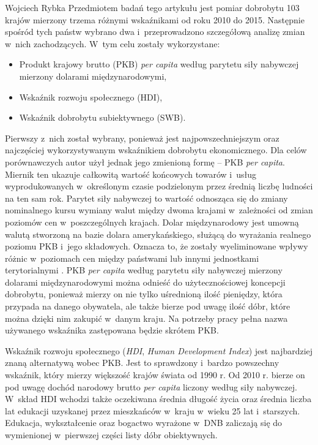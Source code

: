 \begin{artplenv}{Wojciech Rybka}
Przedmiotem badań tego artykułu jest pomiar dobrobytu 103 krajów mierzony trzema różnymi wskaźnikami od roku 2010 do
2015. Następnie spośród tych państw wybrano dwa i~przeprowadzono szczegółową analizę zmian w~nich zachodzących.
W~tym celu zostały wykorzystane: 

\begin{itemize}
\item Produkt krajowy brutto (PKB) \textit{per capita} według parytetu siły nabywczej mierzony dolarami międzynarodowymi,
\item Wskaźnik rozwoju społecznego (HDI),
\item Wskaźnik dobrobytu subiektywnego (SWB).
\end{itemize}

Pierwszy z~nich został wybrany, ponieważ jest najpowszechniejszym oraz najczęściej wykorzystywanym wskaźnikiem dobrobytu
ekonomicznego.
Dla celów porównawczych autor użył jednak jego zmienioną formę -- PKB \textit{per capita}. Miernik ten ukazuje
całkowitą wartość
końcowych towarów i~usług wyprodukowanych w~określonym czasie podzielonym przez średnią liczbę ludności na ten sam rok.
Parytet siły nabywczej to wartość odnosząca się do zmiany nominalnego kursu wymiany walut między dwoma krajami
w~zależności od zmian
poziomów cen w~poszczególnych krajach. Dolar międzynarodowy jest umowną walutą stworzoną na bazie dolara
amerykańskiego, służącą do wyrażania realnego poziomu PKB i~jego składowych. Oznacza to, że zostały wyeliminowane
wpływy różnic w~poziomach cen między państwami lub innymi jednostkami terytorialnymi
\parencite{international_monetary_fund_world_2019a}.
PKB \textit{per capita} według parytetu siły nabywczej mierzony
dolarami międzynarodowymi można odnieść do użytecznościowej koncepcji dobrobytu, ponieważ mierzy on nie tylko
uśrednioną ilość pieniędzy, która przypada na danego obywatela, ale także bierze pod uwagę ilość dóbr, które można
dzięki nim zakupić w~danym kraju. Na potrzeby pracy pełna nazwa używanego wskaźnika zastępowana będzie skrótem PKB.

Wskaźnik rozwoju społecznego (\textit{HDI}, \textit{Human Development Index}) jest najbardziej znaną alternatywą wobec
PKB. Jest to sprawdzony i~bardzo powszechny wskaźnik, który mierzy większość krajów świata od 1990 r. Od 2010 r. bierze
on pod uwagę dochód narodowy brutto \textit{per capita} liczony według siły nabywczej.
W~skład HDI wchodzi także oczekiwana średnia długość życia oraz średnia liczba lat
edukacji uzyskanej przez mieszkańców w~kraju w~wieku 25 lat i~starszych. Edukacja, wykształcenie oraz bogactwo
wyrażone w~DNB zaliczają się do wymienionej w~pierwszej części listy dóbr obiektywnych.


\end{artplenv}
